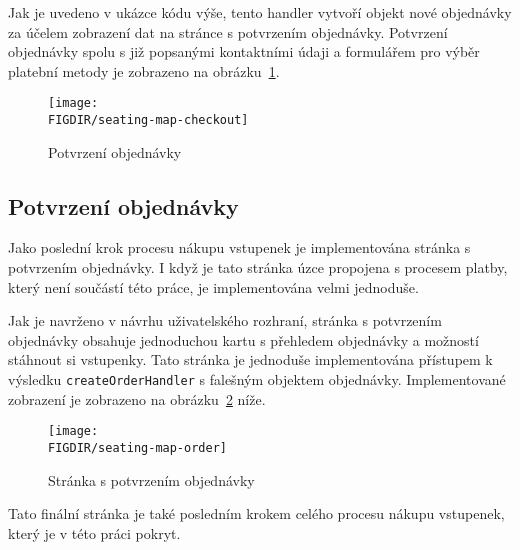 Jak je uvedeno v ukázce kódu výše, tento handler vytvoří objekt nové objednávky za účelem zobrazení dat na stránce s potvrzením objednávky. Potvrzení objednávky spolu s již popsanými kontaktními údaji a formulářem pro výběr platební metody je zobrazeno na obrázku~\ref{fig:seating-map-checkout}.

\begin{figure}[H]
	\centering
	\texttt{[image: \\FIGDIR/seating-map-checkout]}
	\caption{Potvrzení objednávky}
	\label{fig:seating-map-checkout}
\end{figure}

\subsection{Potvrzení objednávky}
\label{subsec:implementace-checkout-order-confirmation}
Jako poslední krok procesu nákupu vstupenek je implementována stránka s potvrzením objednávky.
I když je tato stránka úzce propojena s procesem platby, který není součástí této práce, je implementována velmi jednoduše.

Jak je navrženo v návrhu uživatelského rozhraní, stránka s potvrzením objednávky obsahuje jednoduchou kartu s přehledem objednávky a možností stáhnout si vstupenky.
Tato stránka je jednoduše implementována přístupem k výsledku \texttt{createOrderHandler} s falešným objektem objednávky.
Implementované zobrazení je zobrazeno na obrázku~\ref{fig:seating-map-order} níže.

\begin{figure}[H]
	\centering
	\texttt{[image: \\FIGDIR/seating-map-order]}
	\caption{Stránka s potvrzením objednávky}
	\label{fig:seating-map-order}
\end{figure}

Tato finální stránka je také posledním krokem celého procesu nákupu vstupenek, který je v této práci pokryt.
